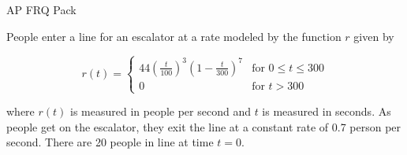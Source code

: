 \documentclass[12pt,addpoints,answers]{exam}
\begin{document}
\begin{center}
{\Large AP FRQ Pack}
\end{center}
\begin{questions}
\question
People enter a line for an escalator at a rate modeled by the function $r$ given by \par $$r(t) = \begin{cases} 44\left(\frac{t}{100}\right)^3\left(1 - \frac{t}{300}\right)^7 & \text{for } 0 \le t \le 300 \\ 0 & \text{for } t > 300 \end{cases}$$ \par where $r(t)$ is measured in people per second and $t$ is measured in seconds. As people get on the escalator, they exit the line at a constant rate of 0.7 person per second. There are 20 people in line at time $t = 0$.
\end{questions}
\end{document}

